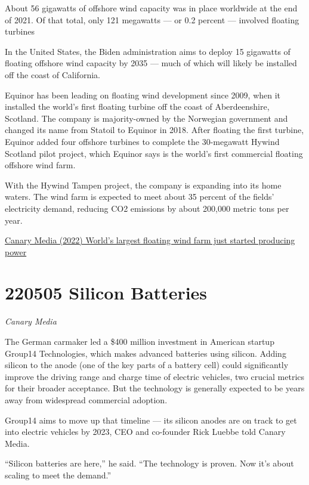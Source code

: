 \documentclass[
]{book}
\begin{document}
About 56 gigawatts of offshore wind capacity was in place worldwide at the end of 2021. Of that total, only 121 megawatts --- or 0.2 percent --- involved floating turbines

In the United States, the Biden administration aims to deploy 15 gigawatts of floating offshore wind capacity by 2035 --- much of which will likely be installed off the coast of California.

Equinor has been leading on floating wind development since 2009, when it installed the world's first floating turbine off the coast of Aberdeenshire, Scotland. The company is majority-owned by the Norwegian government and changed its name from Statoil to Equinor in 2018. After floating the first turbine, Equinor added four offshore turbines to complete the 30-megawatt Hywind Scotland pilot project, which Equinor says is the world's first commercial floating offshore wind farm.

With the Hywind Tampen project, the company is expanding into its home waters.
The wind farm is expected to meet about 35 percent of the fields' electricity demand, reducing CO2 emissions by about 200,000 metric tons per year.

\href{https://www.canarymedia.com/articles/wind/worlds-largest-floating-wind-farm-just-started-generating-power}{Canary Media (2022) World's largest floating wind farm just started producing power}

\hypertarget{silicon-batteries}{%
\section{220505 Silicon Batteries}\label{silicon-batteries}}

\emph{Canary Media}

The German carmaker led a \$400 million investment in American startup Group14 Technologies, which makes advanced batteries using silicon. Adding silicon to the anode (one of the key parts of a battery cell) could significantly improve the driving range and charge time of electric vehicles, two crucial metrics for their broader acceptance. But the technology is generally expected to be years away from widespread commercial adoption.

Group14 aims to move up that timeline --- its silicon anodes are on track to get into electric vehicles by 2023, CEO and co-founder Rick Luebbe told Canary Media.

``Silicon batteries are here,'' he said. \hspace{0pt}``The technology is proven. Now it's about scaling to meet the demand.''
\end{document}
